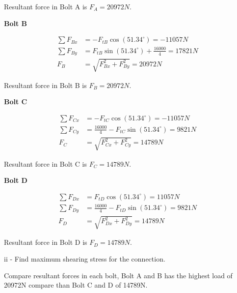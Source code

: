 \documentclass[a4paper, fleqn]{article}
\begin{document}
Resultant force in Bolt A is $F_A=20972N$.
\vspace{10pt}

\textbf{Bolt B}

\begin{equation*}
    \begin{aligned}
        \sum F_{Bx} &= -F_{tB} \cos(51.34^{\circ})= -11057N\\
        \sum F_{By} &= F_{tB} \sin(51.34^{\circ}) + \frac{16000}{4}=17821N\\
        F_{B}&=\sqrt{F_{Bx}^2+F_{By}^2}=20972N
    \end{aligned}
\end{equation*}

Resultant force in Bolt B is $F_B=20972N$.\\
\vspace{10pt}


\textbf{Bolt C}

\begin{equation*}
    \begin{aligned}
        \sum F_{Cx} &= -F_{tC} \cos(51.34^{\circ})= -11057N\\
        \sum F_{Cy} &= \frac{16000}{4}-F_{tC} \sin(51.34^{\circ}) =9821N\\
        F_{C}&=\sqrt{F_{Cx}^2+F_{Cy}^2}=14789N
    \end{aligned}
\end{equation*}

Resultant force in Bolt C is $F_C=14789N$.\\
\vspace{10pt}

\textbf{Bolt D}

\begin{equation*}
    \begin{aligned}
        \sum F_{Dx} &= F_{tD} \cos(51.34^{\circ})= 11057N\\
        \sum F_{Dy} &= \frac{16000}{4}-F_{tD} \sin(51.34^{\circ}) =9821N\\
        F_{D}&=\sqrt{F_{Dx}^2+F_{Dy}^2}=14789N
    \end{aligned}
\end{equation*}

Resultant force in Bolt D is $F_D=14789N$.
\vspace{10pt}

ii - Find maximum shearing stress for the connection.
\vspace{10pt}

Compare resultant forces in each bolt, Bolt A and B has the highest load of 20972N compare than Bolt C and D of 14789N.
\end{document}
